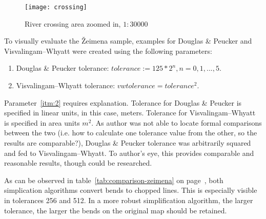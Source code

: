 \documentclass[a4paper]{article}
\newcommand{\DP}{Douglas \& Peucker}
\newcommand{\VW}{Visvalingam--Whyatt}
\begin{document}
\begin{figure}[h]
    \centering
    \texttt{[image: crossing]}
    \caption{River crossing area zoomed in, $1:30 000$}
    \label{fig:crossing}
\end{figure}

To visually evaluate the Žeimena sample, examples for {\DP} and {\VW}
were created using the following parameters:

\begin{enumerate}[label=(\Roman*)]
    \item {\DP} tolerance: $tolerance := 125 * 2^n, n = 0,1,...,5$.
    \item {\VW} tolerance: $vwtolerance = tolerance ^ 2$\label{itm:2}.
\end{enumerate}

Parameter~\ref{itm:2} requires explanation. Tolerance for {\DP} is specified in
linear units, in this case, meters. Tolerance for {\VW} is specified in area
units $m^2$. As author was not able to locate formal comparisons between the
two (i.e. how to calculate one tolerance value from the other, so the results
are comparable?), {\DP} tolerance was arbitrarily squared and fed to {\VW}. To
author's eye, this provides comparable and reasonable results, though could be
researched.

As can be observed in table~\ref{tab:comparison-zeimena} on
page~\pageref{tab:comparison-zeimena}, both simplication algorithms convert
bends to chopped lines. This is especially visible in tolerances 256 and 512.
In a more robust simplification algorithm, the larger tolerance, the larger the
bends on the original map should be retained.
\end{document}
